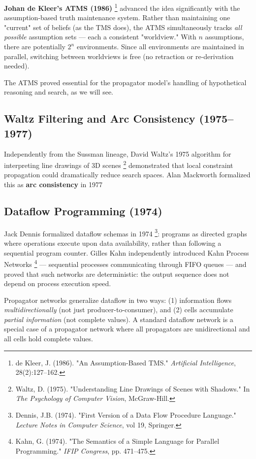 \documentclass[11pt]{article}
\begin{document}
\textbf{Johan de Kleer's ATMS (1986)} \footnote{de Kleer, J. (1986). "An Assumption-Based TMS."
\emph{Artificial Intelligence}, 28(2):127--162.} advanced the idea
significantly with the assumption-based truth maintenance system.
Rather than maintaining one "current" set of beliefs (as the TMS does),
the ATMS simultaneously tracks \emph{all possible} assumption sets --- each a
consistent "worldview." With \(n\) assumptions, there are potentially
\(2^n\) environments. Since all environments are maintained in parallel,
switching between worldviews is free (no retraction or re-derivation
needed).

The ATMS proved essential for the propagator model's handling of
hypothetical reasoning and search, as we will see.
\subsection{Waltz Filtering and Arc Consistency (1975--1977)}
\label{sec:org0d36c57}

Independently from the Sussman lineage, David Waltz's 1975 algorithm for
interpreting line drawings of 3D scenes \footnote{Waltz, D. (1975). "Understanding Line Drawings of Scenes
with Shadows." In \emph{The Psychology of Computer Vision}, McGraw-Hill.} demonstrated that
local constraint propagation could dramatically reduce search spaces.
Alan Mackworth formalized this as \textbf{arc consistency} in 1977
\subsection{Dataflow Programming (1974)}
\label{sec:orgdd3763f}

Jack Dennis formalized dataflow schemas in 1974 \footnote{Dennis, J.B. (1974). "First Version of a Data Flow
Procedure Language." \emph{Lecture Notes in Computer Science}, vol 19,
Springer.}: programs
as directed graphs where operations execute upon data availability,
rather than following a sequential program counter. Gilles Kahn
independently introduced Kahn Process Networks \footnote{Kahn, G. (1974). "The Semantics of a Simple Language for
Parallel Programming." \emph{IFIP Congress}, pp. 471--475.} --- sequential
processes communicating through FIFO queues --- and proved that such
networks are deterministic: the output sequence does not depend on
process execution speed.

Propagator networks generalize dataflow in two ways: (1) information
flows \emph{multidirectionally} (not just producer-to-consumer), and (2)
cells accumulate \emph{partial information} (not complete values). A standard
dataflow network is a special case of a propagator network where all
propagators are unidirectional and all cells hold complete values.
\end{document}
